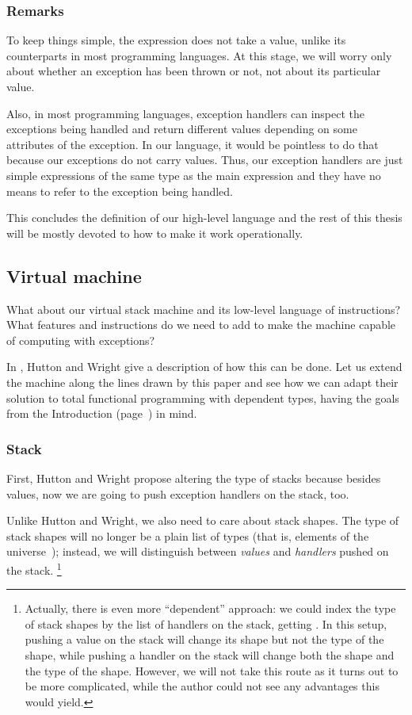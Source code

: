 \subsubsection{Remarks}

To keep things simple, the  expression does not take a value,
unlike its counterparts in most programming languages. At this stage, we will
worry only about whether an exception has been thrown or not, not about its
particular value.

Also, in most programming languages, exception handlers can inspect the
exceptions being handled and return different values depending on some
attributes of the exception. In our language, it would be pointless to do that
because our exceptions do not carry values. Thus, our exception handlers are
just simple expressions of the same type as the main expression and they have
no means to refer to the exception being handled.

This concludes the definition of our high-level language and the rest of this thesis
will be mostly devoted to how to make it work operationally.

\subsection{Virtual machine}

What about our virtual stack machine and its low-level language of
instructions? What features and instructions do we need to add to make the
machine capable of computing with exceptions?

In \cite{gmh:exceptions}, Hutton and Wright give a description of how this can
be done. Let us extend the machine along the lines drawn by this paper and see
how we can adapt their solution to total functional programming with dependent
types, having the goals from the Introduction (page~\pageref{objectives}) in
mind.

\subsubsection{Stack}

First, Hutton and Wright propose altering the type of stacks because besides
values, now we are going to push exception handlers on the stack, too.

Unlike Hutton and Wright, we also need to care about stack shapes.
The type of stack shapes will no longer be a plain
list of types (that is, elements of the universe~); instead, we  will
distinguish between \emph{values} and \emph{handlers} pushed on the stack.
\footnote{Actually, there is even more ``dependent'' approach: we could
index the type of stack shapes by the list of handlers on the stack, getting
. In this setup, pushing a value on the stack
will change its shape but not the type of the shape, while pushing a handler
on the stack will change both the shape and the type of the shape. However, we
will not take this route as it turns out to be more complicated, while the author
could not see any advantages this would yield.}

